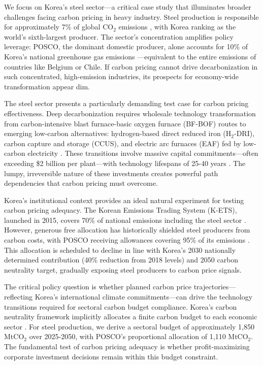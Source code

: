 \documentclass[preprint,1p,authoryear]{elsarticle}
\begin{document}
We focus on Korea's steel sector—a critical case study that illuminates broader challenges facing carbon pricing in heavy industry. Steel production is responsible for approximately 7\% of global CO$_2$ emissions \citep{worldsteel2022}, with Korea ranking as the world's sixth-largest producer. The sector's concentration amplifies policy leverage: POSCO, the dominant domestic producer, alone accounts for 10\% of Korea's national greenhouse gas emissions \citep{kosis2023}—equivalent to the entire emissions of countries like Belgium or Chile. If carbon pricing cannot drive decarbonization in such concentrated, high-emission industries, its prospects for economy-wide transformation appear dim.

The steel sector presents a particularly demanding test case for carbon pricing effectiveness. Deep decarbonization requires wholesale technology transformation from carbon-intensive blast furnace-basic oxygen furnace (BF-BOF) routes to emerging low-carbon alternatives: hydrogen-based direct reduced iron (H$_2$-DRI), carbon capture and storage (CCUS), and electric arc furnaces (EAF) fed by low-carbon electricity \citep{IEA2020steel}. These transitions involve massive capital commitments—often exceeding \$2 billion per plant—with technology lifespans of 25-40 years \citep{materialeconomics2019}. The lumpy, irreversible nature of these investments creates powerful path dependencies that carbon pricing must overcome.

Korea's institutional context provides an ideal natural experiment for testing carbon pricing adequacy. The Korean Emissions Trading System (K-ETS), launched in 2015, covers 70\% of national emissions including the steel sector \citep{kim2021kets}. However, generous free allocation has historically shielded steel producers from carbon costs, with POSCO receiving allowances covering 95\% of its emissions \citep{icap2024korea}. This allocation is scheduled to decline in line with Korea's 2030 nationally determined contribution (40\% reduction from 2018 levels) and 2050 carbon neutrality target, gradually exposing steel producers to carbon price signals.

The critical policy question is whether planned carbon price trajectories—reflecting Korea's international climate commitments—can drive the technology transitions required for sectoral carbon budget compliance. Korea's carbon neutrality framework implicitly allocates a finite carbon budget to each economic sector \citep{korea2020carbon}. For steel production, we derive a sectoral budget of approximately 1,850 MtCO$_2$ over 2025-2050, with POSCO's proportional allocation of 1,110 MtCO$_2$. The fundamental test of carbon pricing adequacy is whether profit-maximizing corporate investment decisions remain within this budget constraint.
\end{document}
